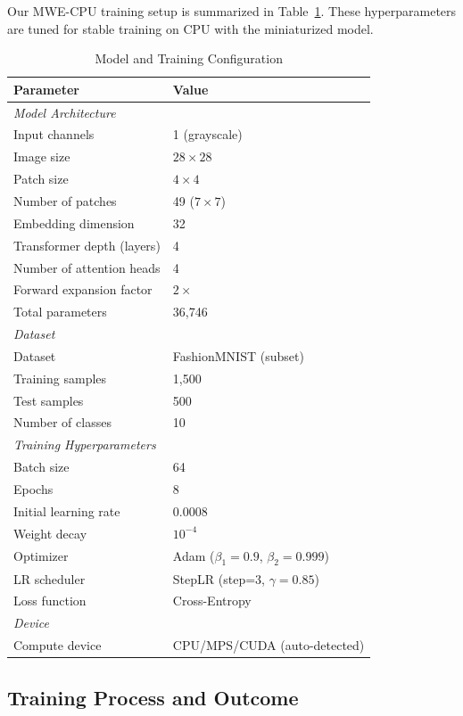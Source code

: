 \documentclass{article}
\begin{document}
Our MWE-CPU training setup is summarized in Table~\ref{tab:config}. These hyperparameters are tuned for stable training on CPU with the miniaturized model.

\begin{table}[H]
\centering
\caption{Model and Training Configuration}
\label{tab:config}
\begin{tabular}{ll}
\toprule
\textbf{Parameter} & \textbf{Value} \\
\midrule
\multicolumn{2}{l}{\textit{Model Architecture}} \\
\midrule
Input channels & 1 (grayscale) \\
Image size & $28 \times 28$ \\
Patch size & $4 \times 4$ \\
Number of patches & 49 ($7 \times 7$) \\
Embedding dimension & 32 \\
Transformer depth (layers) & 4 \\
Number of attention heads & 4 \\
Forward expansion factor & $2\times$ \\
Total parameters & 36,746 \\
\midrule
\multicolumn{2}{l}{\textit{Dataset}} \\
\midrule
Dataset & FashionMNIST (subset) \\
Training samples & 1,500 \\
Test samples & 500 \\
Number of classes & 10 \\
\midrule
\multicolumn{2}{l}{\textit{Training Hyperparameters}} \\
\midrule
Batch size & 64 \\
Epochs & 8 \\
Initial learning rate & 0.0008 \\
Weight decay & $10^{-4}$ \\
Optimizer & Adam ($\beta_1=0.9$, $\beta_2=0.999$) \\
LR scheduler & StepLR (step=3, $\gamma=0.85$) \\
Loss function & Cross-Entropy \\
\midrule
\multicolumn{2}{l}{\textit{Device}} \\
\midrule
Compute device & CPU/MPS/CUDA (auto-detected) \\
\bottomrule
\end{tabular}
\end{table}

\subsection{Training Process and Outcome}
\end{document}
